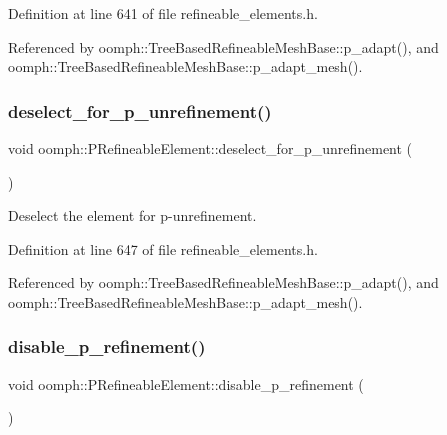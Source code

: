 Definition at line 641 of file refineable\+\_\+elements.\+h.



Referenced by oomph\+::\+Tree\+Based\+Refineable\+Mesh\+Base\+::p\+\_\+adapt(), and oomph\+::\+Tree\+Based\+Refineable\+Mesh\+Base\+::p\+\_\+adapt\+\_\+mesh().

\mbox{\label{classoomph_1_1PRefineableElement_a9885c7f63cc66df42692505f2261dc88}} 
\subsubsection{\texorpdfstring{deselect\+\_\+for\+\_\+p\+\_\+unrefinement()}{deselect\_for\_p\_unrefinement()}}
{\footnotesize\ttfamily void oomph\+::\+P\+Refineable\+Element\+::deselect\+\_\+for\+\_\+p\+\_\+unrefinement (\begin{DoxyParamCaption}{ }\end{DoxyParamCaption})\hspace{0.3cm}{\ttfamily [inline]}}



Deselect the element for p-\/unrefinement. 



Definition at line 647 of file refineable\+\_\+elements.\+h.



Referenced by oomph\+::\+Tree\+Based\+Refineable\+Mesh\+Base\+::p\+\_\+adapt(), and oomph\+::\+Tree\+Based\+Refineable\+Mesh\+Base\+::p\+\_\+adapt\+\_\+mesh().

\mbox{\label{classoomph_1_1PRefineableElement_a7947f3fe08f0545cdffb3a6b773d4cf5}} 
\subsubsection{\texorpdfstring{disable\+\_\+p\+\_\+refinement()}{disable\_p\_refinement()}}
{\footnotesize\ttfamily void oomph\+::\+P\+Refineable\+Element\+::disable\+\_\+p\+\_\+refinement (\begin{DoxyParamCaption}{ }\end{DoxyParamCaption})\hspace{0.3cm}{\ttfamily [inline]}}



